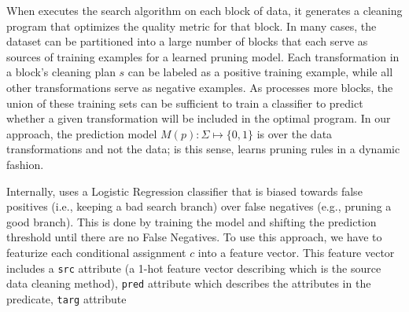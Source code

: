 When \sys executes the search algorithm on each block of data, it generates a cleaning program that optimizes the quality metric for that block.  In many cases, the dataset can be partitioned into a large number of blocks that each serve as sources of training examples for a learned pruning model.  Each transformation in a block's  cleaning plan $s$ can be labeled as a positive training example, while all other transformations serve as negative examples.
As \sys processes more blocks, the union of these training sets can be sufficient to train a classifier to predict whether a given transformation will be included in the optimal program.  In our approach, the prediction model $M(p): \Sigma \mapsto \{0,1\}$ is over the data transformations and not the data; is this sense, \sys learns pruning rules in a dynamic fashion.    


Internally, \sys uses a Logistic Regression classifier that is biased towards false positives (i.e., keeping a bad search branch) over false negatives (e.g., pruning a good branch). This is done by training the model and shifting the prediction threshold until there are no False Negatives. 
To use this approach, we have to featurize each conditional assignment $c$ into a feature vector.
This feature vector includes a \texttt{src} attribute (a 1-hot feature vector describing which is the source data cleaning method), \texttt{pred} attribute which describes the attributes in the predicate, \texttt{targ} attribute

\iffalse
\stitle{Faster Data Quality Refinement}
\ewu{I emphasize this assuming the experiment exists!!!}
One benefit of learning a pruning model for {\it data transformations} rather than relation instances is that it can potentially be reused or fine-tuned for new, but structurally similar, data cleaning problems.  For instance, when users iteratively refine the data quality measure, the problem is largely the same, and \sys can intialize the search with the previously learned model.  This has the potential to learn  {\it across data cleaning problems} rather than across blocks within a single problem.   \ewu{We evaluate the benefits of re-using models during iterative refinement in Section~\ref{XXX}.}
\fi


